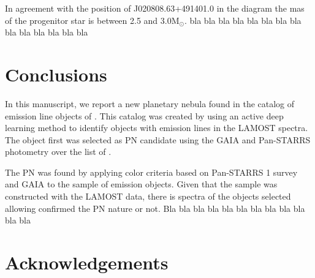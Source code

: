 \documentclass[fleqn,usenatbib]{mnras}
\begin{document}
In agreement with the
position of J020808.63+491401.0 in the diagram the mas of the progenitor star is
between 2.5 and 3.0M$_{\odot}$. {\sc bla bla bla bla bla bla bla bla bla bla bla bla bla bla}

\section{Conclusions}
\label{sec:conclu}

In this manuscript, we report a new planetary nebula found
in the catalog of emission line objects of \citet{Skoda:2020}.
This catalog was created by using an active deep learning method
to identify objects with emission lines in the LAMOST spectra.
The object first was selected as PN candidate using the GAIA
and Pan-STARRS photometry over the list of \citet{Skoda:2020}.

The PN was found by applying color criteria based on Pan-STARRS 1
 survey and GAIA to the sample of emission objects.
Given that the \citet{Skoda:2020} sample was constructed
with the LAMOST data, there is spectra of the objects selected
allowing confirmed the PN nature or not.
Bla bla bla bla bla bla bla bla bla bla bla bla

\section*{Acknowledgements}
\end{document}
